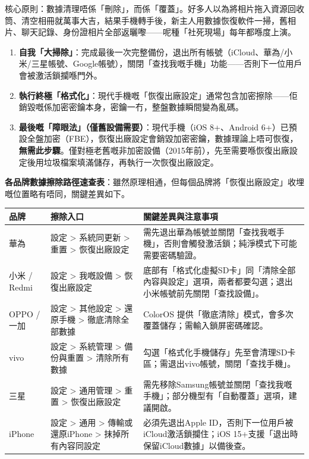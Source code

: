 


核心原則：數據清理唔係「刪除」，而係「覆蓋」。好多人以為將相片拖入資源回收筒、清空相冊就萬事大吉，結果手機轉手後，新主人用數據恢復軟件一掃，舊相片、聊天記錄、身份證相片全部返曬嚟——呢種「社死現場」每年都喺度上演。

\begin{enumerate}
  \item \textbf{自我「大掃除」}：完成最後一次完整備份，退出所有帳號（iCloud、華為/小米/三星帳號、Google帳號），關閉「查找我嘅手機」功能——否則下一位用戶會被激活鎖攔喺門外。
  \item \textbf{執行終極「格式化」}：現代手機嘅「恢復出廠設定」通常包含加密擦除——佢銷毀嘅係加密密鑰本身，密鑰一冇，整盤數據瞬間變為亂碼。
  \item \textbf{最後嘅「障眼法」（僅舊設備需要）}：現代手機（iOS 8+、Android 6+）已預設全盤加密（FBE），恢復出廠設定會銷毀加密密鑰，數據理論上唔可恢復，\textbf{無需此步驟}。僅對極老舊嘅非加密設備（2015年前），先至需要喺恢復出廠設定後用垃圾檔案填滿儲存，再執行一次恢復出廠設定。
\end{enumerate}

\textbf{各品牌數據擦除路徑速查表}：雖然原理相通，但每個品牌將「恢復出廠設定」收埋嘅位置略有唔同，關鍵差異如下。

\begin{center}
\begin{tabularx}{\linewidth}{|X|X|X|}
\hline
\textbf{品牌} & \textbf{擦除入口} & \textbf{關鍵差異與注意事項} \tabularnewline
\hline
華為 & 設定 > 系統同更新 > 重置 > 恢復出廠設定 & 需先退出華為帳號並關閉「查找我嘅手機」，否則會觸發激活鎖；純淨模式下可能需要密碼驗證。 \tabularnewline
小米 / Redmi & 設定 > 我嘅設備 > 恢復出廠設定 & 底部有「格式化虛擬SD卡」同「清除全部內容與設定」選項，兩者都要勾選；退出小米帳號前先關閉「查找設備」。 \tabularnewline
OPPO / 一加 & 設定 > 其他設定 > 還原手機 > 徹底清除全部數據 & ColorOS 提供「徹底清除」模式，會多次覆蓋儲存；需輸入鎖屏密碼確認。 \tabularnewline
vivo & 設定 > 系統管理 > 備份與重置 > 清除所有數據 & 勾選「格式化手機儲存」先至會清理SD卡區；需退出vivo帳號，關閉「查找手機」。 \tabularnewline
三星 & 設定 > 通用管理 > 重置 > 恢復出廠設定 & 需先移除Samsung帳號並關閉「查找我嘅手機」；部分機型有「自動覆蓋」選項，建議開啟。 \tabularnewline
iPhone & 設定 > 通用 > 傳輸或還原iPhone > 抹掉所有內容同設定 & 必須先退出Apple ID，否則下一位用戶被iCloud激活鎖攔住；iOS 15+支援「退出時保留iCloud數據」以備後查。 \tabularnewline
\hline
\end{tabularx}
\end{center}

